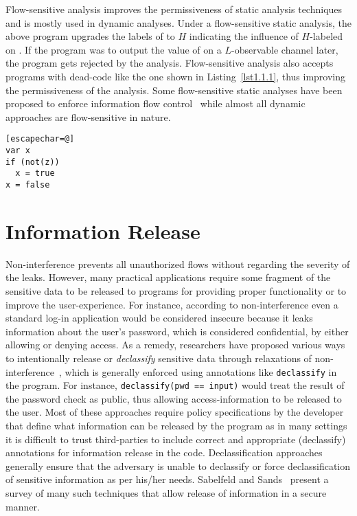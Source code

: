 Flow-sensitive analysis improves the permissiveness of static analysis
techniques and is mostly used in dynamic analyses. Under a
flow-sensitive static analysis, the above program 
upgrades the labels of  to $H$ indicating the
influence of $H$-labeled  on . If the program was to
output the value of  on a $L$-observable channel later, the
program gets rejected by the analysis. Flow-sensitive analysis also
accepts programs with dead-code like the one shown in
Listing~\ref{lst1.1.1}, 
thus improving the permissiveness of the analysis. Some 
flow-sensitive static analyses have been proposed to enforce
information flow control~\cite{hunt2006:types,hammer09ijis} while
almost all dynamic approaches are flow-sensitive in nature. 

\begin{lstlisting}[float,caption=Permissiveness of flow-sensitive
  analysis,label=lst1.1.1][escapechar=@] 
var x
if (not(z))
  x = true
x = false
\end{lstlisting}

\section{Information Release}
Non-interference prevents all unauthorized flows without
regarding the severity of the leaks. However, many practical
applications require some fragment of the sensitive data to be
released to programs for providing proper functionality or to improve
the user-experience. For instance, according to non-interference even
a standard log-in application would be considered insecure because it
leaks information about the user’s password, which is considered 
confidential, by either allowing or denying access. 
As a remedy, researchers have proposed various ways to intentionally
release or \emph{declassify} sensitive data through relaxations of
non-interference~\cite{dimDecl}, which is generally enforced using
annotations like \texttt{declassify} in the program. For instance,
\texttt{declassify(pwd == input)} would treat the result 
of the password check as public, thus allowing access-information to
be released to the user. Most of these approaches require policy
specifications by the developer that define what information can be
released by the program as in many settings it is difficult to trust 
third-parties to include correct and appropriate (declassify)
annotations for information release in the code. Declassification
approaches generally ensure that the adversary is unable to declassify
or force declassification of sensitive information as per his/her
needs. Sabelfeld and Sands~\cite{dimDecl} present a survey
of many such techniques that allow release of information in a secure
manner. 

